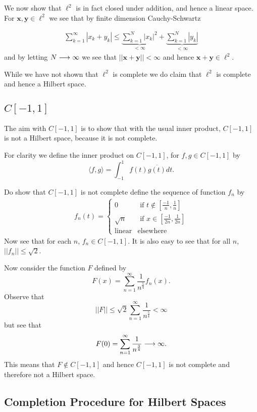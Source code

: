 \documentclass{unswmaths}
\begin{document}
We now show that $ \ell^2 $ is in fact closed under addition, and hence a linear space.
For $ \mathbf{x}, \mathbf{y} \in \ell^2 $ we see that by finite dimension Cauchy-Schwartz 

\begin{align*}
	\sum_{k=1}^\infty |x_k + y_k|  \leq \underbrace{\sum_{k=1}^N |x_k|^2}_{< \infty}  + \underbrace{\sum_{k=1}^N |y_k|}_{< \infty}
\end{align*}
and by letting $ N \longrightarrow \infty $ we see that $ || \mathbf{x} + \mathbf{y} || < \infty $ and hence $ \mathbf{x} + \mathbf{y} \in \ell^2 $.

While we have not shown that $ \ell^2 $ is complete we do claim that $ \ell^2 $ is complete and hence a Hilbert space.

\subsection*{$ C[-1, 1] $}

The aim with $ C[-1, 1] $ is to show that with the usual inner product, $ C[-1, 1] $ is not a Hilbert space, because it is 
not complete.

For clarity we define the inner product on $ C[-1,1] $, for $ f, g \in C[-1,1] $ by 
$$
	\langle f, g \rangle = \int_{-1}^1 f(t) \overline{g(t)} dt.
$$

Do show that $ C[-1, 1] $ is not complete define the sequence of function $ f_n $ by
\begin{align*}
	f_n(t) = 
	\begin{cases}
		0	& \text{ if } t \not\in \left[\frac{-1}{n}, \frac{1}{n} \right] \\
		\sqrt{n} & \text{ if } x \in \left[ \frac{-1}{2n}, \frac{1}{2n} \right] \\
		\text{linear} & \text{elsewhere} 
	\end{cases}
\end{align*}
Now see that for each $ n $, $ f_n \in C[-1,1] $. It is also easy to see that for all $ n $, $ || f_n || \leq \sqrt{2} $.

Now consider the function $ F $ defined by 
$$
	F(x) = \sum_{n=1}^\infty \frac{1}{n^\frac{5}{4}} f_n(x).
$$
Observe that $$ ||F||  \leq \sqrt{2} \sum_{n=1}^\infty \frac{1}{n^\frac{5}{4}} < \infty $$
but see that 
$$
	F(0) = \sum_{n=1}^\infty \frac{1}{n^\frac{3}{4}} \longrightarrow \infty.
$$
This means that $ F \not\in C[-1,1] $ and hence $ C[-1,1] $ is not complete and therefore not a Hilbert space.

\subsection*{Completion Procedure for Hilbert Spaces}
\end{document}
